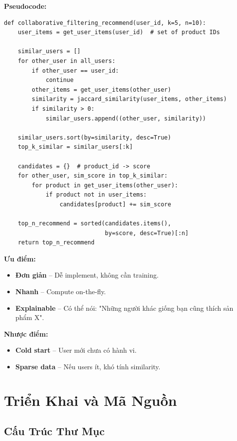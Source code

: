 \documentclass[12pt,a4paper]{article}
\begin{document}
\textbf{Pseudocode:}
\begin{verbatim}
def collaborative_filtering_recommend(user_id, k=5, n=10):
    user_items = get_user_items(user_id)  # set of product IDs
    
    similar_users = []
    for other_user in all_users:
        if other_user == user_id:
            continue
        other_items = get_user_items(other_user)
        similarity = jaccard_similarity(user_items, other_items)
        if similarity > 0:
            similar_users.append((other_user, similarity))
    
    similar_users.sort(by=similarity, desc=True)
    top_k_similar = similar_users[:k]
    
    candidates = {}  # product_id -> score
    for other_user, sim_score in top_k_similar:
        for product in get_user_items(other_user):
            if product not in user_items:
                candidates[product] += sim_score
    
    top_n_recommend = sorted(candidates.items(), 
                             by=score, desc=True)[:n]
    return top_n_recommend
\end{verbatim}

\textbf{Ưu điểm:}
\begin{itemize}
    \item \textbf{Đơn giản} – Dễ implement, không cần training.
    \item \textbf{Nhanh} – Compute on-the-fly.
    \item \textbf{Explainable} – Có thể nói: "Những người khác giống bạn cũng thích sản phẩm X".
\end{itemize}

\textbf{Nhược điểm:}
\begin{itemize}
    \item \textbf{Cold start} – User mới chưa có hành vi.
    \item \textbf{Sparse data} – Nếu users ít, khó tính similarity.
\end{itemize}


\newpage
\section{Triển Khai và Mã Nguồn}

\subsection{Cấu Trúc Thư Mục}
\end{document}
